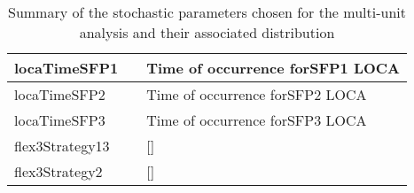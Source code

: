 \begin{table}
\begin{center}
\begin{tabular}{ | l | p{5cm} | p{5cm} |}
         locaTimeSFP1       &              & Time of occurrence forSFP1 LOCA  \\ \hline
         locaTimeSFP2       &              & Time of occurrence forSFP2 LOCA  \\ \hline
         locaTimeSFP3       &              & Time of occurrence forSFP3 LOCA  \\ \hline
        flex3Strategy13    &              & []                 \\ \hline
        flex3Strategy2     &              & []                 \\ 
        \hline
      \end{tabular}
  \end{center}
  \caption{Summary of the stochastic parameters chosen for the multi-unit analysis and their associated distribution}
  \label{tab:stochasticParameters}
\end{table}


